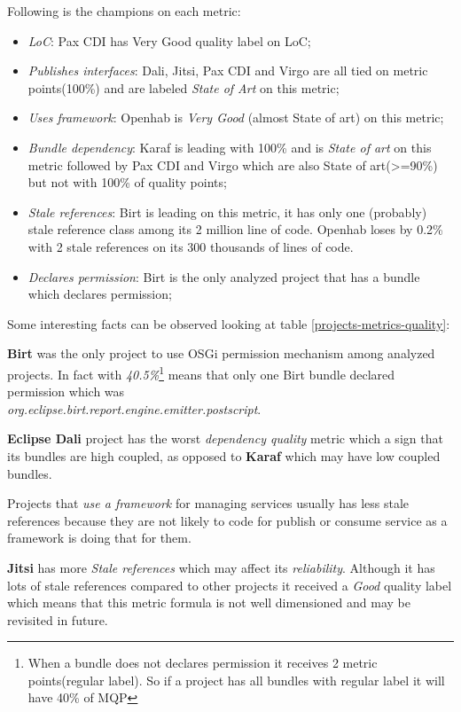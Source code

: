 Following is the champions on each metric:


\begin{itemize}
\item \emph{LoC}: Pax CDI has Very Good quality label on LoC;
\item \emph{Publishes interfaces}: Dali, Jitsi, Pax CDI and Virgo are all tied on metric points(100\%) and are labeled \emph{State of Art} on this metric;
\item \emph{Uses framework}: Openhab is \emph{Very Good} (almost State of art) on this metric;
\item \emph{Bundle dependency}: Karaf is leading with 100\% and is \emph{State of art} on this metric followed by Pax CDI and Virgo which are also State of art(>=90\%) but not with 100\% of quality points;  
\item \emph{Stale references}: Birt is leading on this metric, it has only one (probably) stale reference class among its 2 million line of code. Openhab loses by 0.2\% with 2 stale references on its 300 thousands of lines of code.  
\item \emph{Declares permission}: Birt is the only analyzed project that has a bundle which declares permission;
\end{itemize}

Some interesting facts can be observed looking at table \ref{projects-metrics-quality}:

\textbf{Birt} was the only project to use OSGi permission mechanism among analyzed projects. In fact with \emph{40.5\%}\footnote{When a bundle does not declares permission it receives 2 metric points(regular label). So if a project has all bundles with regular label it will have 40\% of MQP} means that only one Birt bundle declared permission which was \\\emph{org.eclipse.birt.report.engine.emitter.postscript}.

\textbf{Eclipse Dali} project has the worst \emph{dependency quality} metric which a sign that its bundles are high coupled, as opposed to \textbf{Karaf} which may have low coupled bundles.

Projects that \emph{use a framework} for managing services usually has less stale references because they are not likely to code for publish or consume service as a framework is doing that for them.

\textbf{Jitsi} has more \emph{Stale references} which may affect its \emph{reliability}. Although it has lots of stale references compared to other projects it received a \emph{Good} quality label which means that this metric formula is not well dimensioned and may be revisited in future.    

